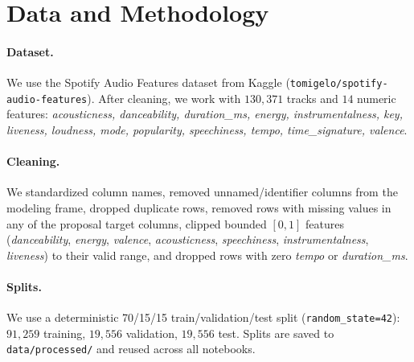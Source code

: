 \documentclass[11pt]{article}
\begin{document}
\section{Data and Methodology}

\paragraph{Dataset.} We use the Spotify Audio Features dataset from Kaggle (\texttt{tomigelo/spotify-audio-features}). After cleaning, we work with $130{,}371$ tracks and $14$ numeric features: \emph{acousticness, danceability, duration\_ms, energy, instrumentalness, key, liveness, loudness, mode, popularity, speechiness, tempo, time\_signature, valence}.

\paragraph{Cleaning.} We standardized column names, removed unnamed/identifier columns from the modeling frame, dropped duplicate rows, removed rows with missing values in any of the proposal target columns, clipped bounded $[0,1]$ features (\emph{danceability}, \emph{energy}, \emph{valence}, \emph{acousticness}, \emph{speechiness}, \emph{instrumentalness}, \emph{liveness}) to their valid range, and dropped rows with zero \emph{tempo} or \emph{duration\_ms}.

\paragraph{Splits.} We use a deterministic 70/15/15 train/validation/test split (\texttt{random\_state=42}): $91{,}259$ training, $19{,}556$ validation, $19{,}556$ test. Splits are saved to \texttt{data/processed/} and reused across all notebooks.
\end{document}
